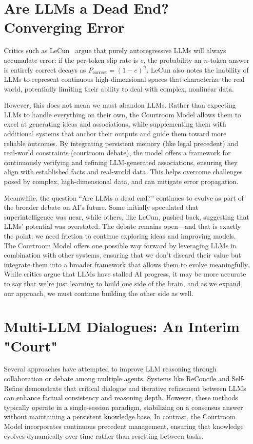 \documentclass[11pt]{article}
\begin{document}
\section{Are LLMs a Dead End? Converging Error}
Critics such as LeCun \citep{LeCun2023SFI}\, argue that
purely autoregressive LLMs will always accumulate error:
if the per-token slip rate is $e$, the probability an
$n$-token answer is entirely correct decays as
$P_{\mathrm{correct}} = (1-e)^{n}$.
LeCun also notes the inability of LLMs to represent continuous high-dimensional spaces that characterize the real world, potentially limiting their ability to deal with complex, nonlinear data.

However, this does not mean we must abandon LLMs. Rather than expecting LLMs to handle everything on their own, the Courtroom Model allows them to excel at generating ideas and associations, while supplementing them with additional systems that anchor their outputs and guide them toward more reliable outcomes. By integrating persistent memory (like legal precedent) and real-world constraints (courtroom debate), the model offers a framework for continuously verifying and refining LLM-generated associations, ensuring they align with established facts and real-world data. This helps overcome challenges posed by complex, high-dimensional data, and can mitigate error propagation.

Meanwhile, the question “Are LLMs a dead end?” continues to evolve as part of the broader debate on AI's future. Some initially speculated that superintelligence was near, while others, like LeCun, pushed back, suggesting that LLMs' potential was overstated. The debate remains open—and that is exactly the point: we need friction to continue exploring ideas and improving models. The Courtroom Model offers one possible way forward by leveraging LLMs in combination with other systems, ensuring that we don't discard their value but integrate them into a broader framework that allows them to evolve meaningfully. While critics argue that LLMs have stalled AI progress, it may be more accurate to say that we're just learning to build one side of the brain, and as we expand our approach, we must continue building the other side as well.

\section{Multi-LLM Dialogues: An Interim "Court"}
\label{sec:multi-llm}
Several approaches have attempted to improve LLM reasoning through collaboration or debate among multiple agents. Systems like ReConcile \citep{chen2024reconcile} and Self-Refine \citep{madaan2023selfrefine} demonstrate that critical dialogue and iterative refinement between LLMs can enhance factual consistency and reasoning depth. However, these methods typically operate in a single-session paradigm, stabilizing on a consensus answer without maintaining a persistent knowledge base. In contrast, the Courtroom Model incorporates continuous precedent management, ensuring that knowledge evolves dynamically over time rather than resetting between tasks.
\end{document}
